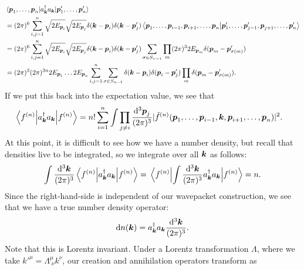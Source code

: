 {{}
\begin{align}
    &\mel{\vb*{p}_{1},\ldots,\vb*{p}_{n}}{a_{\vb*{k}}^{\dagger} a_{\vb*{k}}}{\vb*{p}_{1}',\ldots,\vb*{p}_{n}'} \nonumber \\
    &= (2 \pi)^{6} \sum_{i,j=1}^{n} \sqrt{2 E_{\vb*{p}_{i}}} \sqrt{2 E_{\vb*{p}_{j}}} \delta(\vb*{k} - \vb*{p}_{i}) \delta(\vb*{k} - \vb*{p}_{j}') \ip{\vb*{p}_{1},\ldots,\vb*{p}_{i-1},\vb*{p}_{i+1},\ldots,\vb*{p}_{n}}{\vb*{p}_{1}',\ldots,\vb*{p}_{j-1}',\vb*{p}_{j+1},\ldots,\vb*{p}_{n}'} \nonumber \\
    &= (2 \pi)^{6} \sum_{i,j=1}^{n} \sqrt{2 E_{\vb*{p}_{i}}} \sqrt{2 E_{\vb*{p}_{j}}} \delta(\vb*{k} - \vb*{p}_{i}) \delta(\vb*{k} - \vb*{p}_{j}') \sum_{\sigma \in S_{n-1}} \prod_{m} (2 \pi)^3 2 E_{\vb*{p}_{m}} \delta(\vb*{p}_{m} - \vb*{p}_{\sigma(m)}') \nonumber \\
    &= (2 \pi)^3 (2 \pi)^{3n} 2 E_{\vb*{p}_{1}} \ldots 2 E_{\vb*{p}_{n}} \sum_{i,j=1}^{n} \sum_{\sigma \in S_{n-1}} \delta(\vb*{k} - \vb*{p}_{i}) \delta(\vb*{p}_{i} - \vb*{p}_{j}') \prod_{m} \delta(\vb*{p}_{m} - \vb*{p}_{\sigma(m)}')
.\end{align}
If we put this back into the expectation value, we see that
\begin{align}
    \mel{f^{(n)}}{a_{\vb*{k}}^{\dagger} a_{\vb*{k}}}{f^{(n)}} &= n! \sum_{i=1}^{n} \int \prod_{j \ne i} \frac{\dd[3]{\vb*{p}_{j}}}{(2 \pi)^{3}} | \tilde{f}^{(n)}(\vb*{p}_{1},\ldots,\vb*{p}_{i-1},\vb*{k},\vb*{p}_{i+1},\ldots,\vb*{p}_{n})|^2
.\end{align}
At this point, it is difficult to see how we have a number density, but recall that densities live to be integrated, so we integrate over all $\vb*{k}$ as follows:
\begin{align}
    \int \frac{\dd[3]{\vb*{k}}}{(2 \pi)^3} \mel{f^{(n)}}{a_{\vb*{k}}^{\dagger} a_{\vb*{k}}}{f^{(n)}}  = \mel{f^{(n)}}{ \int \frac{\dd[3]{\vb*{k}}}{(2 \pi)^3} a_{\vb*{k}}^{\dagger} a_{\vb*{k}} }{f^{(n)}} = n
.\end{align}
Since the right-hand-side is independent of our wavepacket construction, we see that we have a true number density operator:
\begin{align}
    \dd{n(\vb*{k})} = a_{\vb*{k}}^{\dagger} a_{\vb*{k}} \frac{\dd[3]{\vb*{k}}}{(2 \pi)^3}
.\end{align}
Note that this is Lorentz invariant.
Under a Lorentz transformation $\Lambda$, where we take $k'^{\mu} = \Lambda^{\mu}_{\;\nu} k^{\nu}$, our creation and annihilation operators transform as
\begin{align}

\end{align}}
